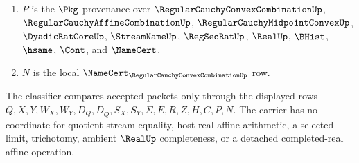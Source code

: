 \begin{definition}
\begin{enumerate}
\item $P$ is the $\Pkg$ provenance over $\RegularCauchyConvexCombinationUp$, $\RegularCauchyAffineCombinationUp$, $\RegularCauchyMidpointConvexUp$, $\DyadicRatCoreUp$, $\StreamNameUp$, $\RegSeqRatUp$, $\RealUp$, $\BHist$, $\hsame$, $\Cont$, and $\NameCert$.
\item $N$ is the local $\NameCert_{\RegularCauchyConvexCombinationUp}$ row.
\end{enumerate}
The classifier compares accepted packets only through the displayed rows $Q,X,Y,W_X,W_Y,D_Q,D_{\bar Q},S_X,S_Y,\Sigma,E,R,Z,H,C,P,N$. The carrier has no coordinate for quotient stream equality, host real affine arithmetic, a selected limit, trichotomy, ambient $\RealUp$ completeness, or a detached completed-real affine operation.
\end{definition}

